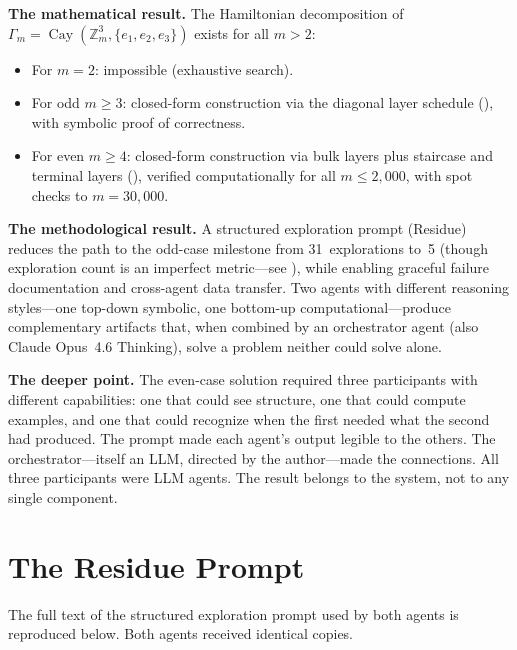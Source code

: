 \documentclass[11pt]{article}
\theoremstyle{definition}
\theoremstyle{remark}
\newcommand{\Zm}{\mathbb{Z}_m}
\newcommand{\Cay}{\operatorname{Cay}}
\begin{document}
\textbf{The mathematical result.} The Hamiltonian decomposition of $\Gamma_m = \Cay(\Zm^3, \{e_1, e_2, e_3\})$ exists for all $m > 2$:
\begin{itemize}
    \item For $m = 2$: impossible (exhaustive search).
    \item For odd $m \geq 3$: closed-form construction via the diagonal layer schedule (), with symbolic proof of correctness.
    \item For even $m \geq 4$: closed-form construction via bulk layers plus staircase and terminal layers (), verified computationally for all $m \leq 2{,}000$, with spot checks to $m = 30{,}000$.
\end{itemize}

\textbf{The methodological result.} A structured exploration prompt (Residue) reduces the path to the odd-case milestone from 31~explorations to~5 (though exploration count is an imperfect metric---see ), while enabling graceful failure documentation and cross-agent data transfer. Two agents with different reasoning styles---one top-down symbolic, one bottom-up computational---produce complementary artifacts that, when combined by an orchestrator agent (also Claude Opus~4.6 Thinking), solve a problem neither could solve alone.

\textbf{The deeper point.} The even-case solution required three participants with different capabilities: one that could see structure, one that could compute examples, and one that could recognize when the first needed what the second had produced. The prompt made each agent's output legible to the others. The orchestrator---itself an LLM, directed by the author---made the connections. All three participants were LLM agents. The result belongs to the system, not to any single component.

\appendix

\section{The Residue Prompt}
\label{app:prompt}

The full text of the structured exploration prompt used by both agents is reproduced below. Both agents received identical copies.

\bigskip
\end{document}
